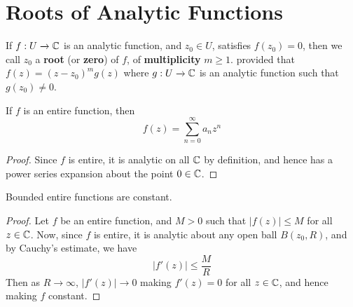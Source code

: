\section{Roots of Analytic Functions}

\begin{definition}
    If $f:U \xrightarrow{} \mathbb{C}$ is an analytic function, and $z_0 \in U$,
    satisfies $f(z_0)=0$, then we call $z_0$ a \textbf{root} (or \textbf{zero})
    of $f$, of \textbf{multiplicity} $m \geq 1$. provided that
    $f(z)=(z-z_0)^mg(z)$ where $g:U \xrightarrow{} \mathbb{C}$ is an analytic function
    such that $g(z_0) \neq 0$.
\end{definition}

\begin{lemma}\label{4.4.1}
    If $f$ is an entire function, then
    \begin{equation*}
        f(z)=\sum_{n=0}^\infty{a_nz^n}
    \end{equation*}
\end{lemma}
\begin{proof}
    Since $f$ is entire, it is analytic on all  $\mathbb{C}$ by definition, and hence
    has a power series expansion about the point $0 \in \mathbb{C}$.
\end{proof}

\begin{theorem}\label{4.4.2}
    Bounded entire functions are constant.
\end{theorem}
\begin{proof}
    Let $f$ be an entire function, and  $M>0$ such that  $|f(z)| \leq M$ for all
    $z \in \mathbb{C}$. Now, since  $f$ is entire, it is analytic about any open ball
    $B(z_0,R)$, and by Cauchy's estimate, we have
    \begin{equation*}
        |f'(z)| \leq \frac{M}{R}
    \end{equation*}
    Then as $R \xrightarrow{} \infty$, $|f'(z)| \xrightarrow{} 0$ making
    $f'(z)=0$ for all $z \in \mathbb{C}$, and hence making $f$ constant.
\end{proof}

